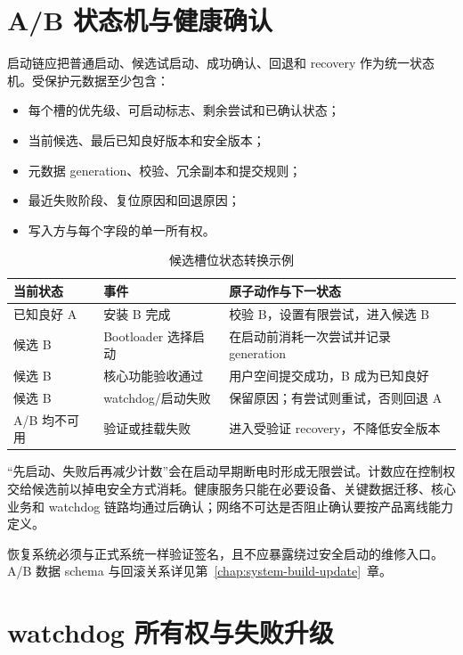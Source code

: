 \section{A/B 状态机与健康确认}

启动链应把普通启动、候选试启动、成功确认、回退和 recovery 作为统一状态机。受保护元数据至少包含：

\begin{itemize}
  \item 每个槽的优先级、可启动标志、剩余尝试和已确认状态；
  \item 当前候选、最后已知良好版本和安全版本；
  \item 元数据 generation、校验、冗余副本和提交规则；
  \item 最近失败阶段、复位原因和回退原因；
  \item 写入方与每个字段的单一所有权。
\end{itemize}

\begin{table}[H]
  \centering
  \caption{候选槽位状态转换示例}
  \begin{tabular}{p{29mm}p{43mm}p{67mm}}
    \hline
    当前状态 & 事件 & 原子动作与下一状态 \\
    \hline
    已知良好 A & 安装 B 完成 & 校验 B，设置有限尝试，进入候选 B \\
    候选 B & Bootloader 选择启动 & 在启动前消耗一次尝试并记录 generation \\
    候选 B & 核心功能验收通过 & 用户空间提交成功，B 成为已知良好 \\
    候选 B & watchdog/启动失败 & 保留原因；有尝试则重试，否则回退 A \\
    A/B 均不可用 & 验证或挂载失败 & 进入受验证 recovery，不降低安全版本 \\
    \hline
  \end{tabular}
\end{table}

“先启动、失败后再减少计数”会在启动早期断电时形成无限尝试。计数应在控制权交给候选前以掉电安全方式消耗。健康服务只能在必要设备、关键数据迁移、核心业务和 watchdog 链路均通过后确认；网络不可达是否阻止确认要按产品离线能力定义。

恢复系统必须与正式系统一样验证签名，且不应暴露绕过安全启动的维修入口。A/B 数据 schema 与回滚关系详见第~\ref{chap:system-build-update}~章。

\section{watchdog 所有权与失败升级}

